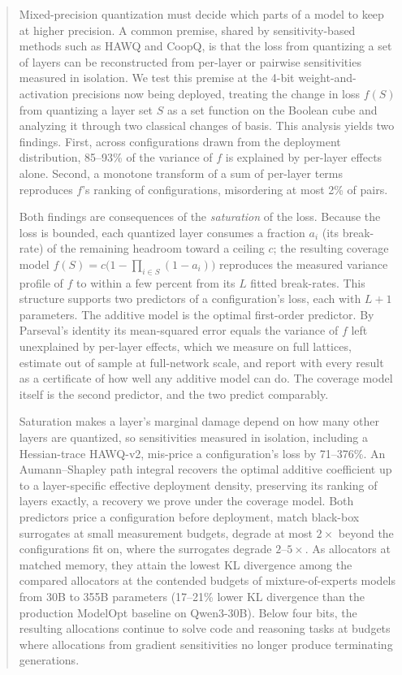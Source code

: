 \maketitle

\begin{abstract}
Mixed-precision quantization must decide which parts of a model to keep at higher precision. A common
premise, shared by sensitivity-based methods such as HAWQ and CoopQ, is that the loss from quantizing a set
of layers can be reconstructed from per-layer or pairwise sensitivities measured in isolation. We test this
premise at the 4-bit weight-and-activation precisions now being deployed, treating the change in loss
$f(S)$ from quantizing a layer set $S$ as a set function on the Boolean cube and
analyzing it through two classical changes of basis. This analysis yields two findings. First, across
configurations drawn from the deployment distribution, 85--93\% of the variance of $f$ is explained by
per-layer effects alone. Second, a monotone transform of a sum of per-layer terms reproduces $f$'s ranking of
configurations, misordering at most 2\% of pairs.

Both findings are consequences of the \emph{saturation} of the loss. Because the loss is bounded, each quantized
layer consumes a fraction $a_i$ (its break-rate) of the remaining headroom toward a ceiling $c$; the
resulting coverage model $f(S)=c\bigl(1-\prod_{i\in S}(1-a_i)\bigr)$ reproduces the measured variance
profile of $f$ to within a few percent from its $L$ fitted break-rates. This structure supports two
predictors of a configuration's loss, each with $L+1$ parameters. The additive model is the optimal
first-order predictor. By Parseval's identity its mean-squared error
equals the variance of $f$ left unexplained by per-layer effects, which we measure on full lattices,
estimate out of sample at full-network scale, and report with every result as
a certificate
of how well any additive model can do. The coverage model itself is the second predictor, and the two
predict comparably.

Saturation makes a layer's marginal damage depend on how many other layers are quantized, so sensitivities
measured in isolation, including a Hessian-trace HAWQ-v2, mis-price a configuration's loss by
71--376\%. An Aumann--Shapley path integral recovers the optimal additive coefficient up to a
layer-specific effective deployment density, preserving its ranking of layers exactly, a recovery we
prove under the coverage model. Both predictors price a configuration before deployment, match black-box
surrogates at small measurement budgets, degrade at most $2\times$ beyond the
configurations fit on, where the surrogates degrade $2$--$5\times$. As allocators at matched memory, they
attain the lowest KL divergence among the compared allocators at the contended budgets of
mixture-of-experts models from 30B to 355B parameters (17--21\% lower KL
divergence than the production ModelOpt baseline on Qwen3-30B).
Below four bits, the resulting allocations continue to solve code and reasoning tasks
at budgets where allocations from gradient sensitivities no longer produce terminating generations.
\end{abstract}

